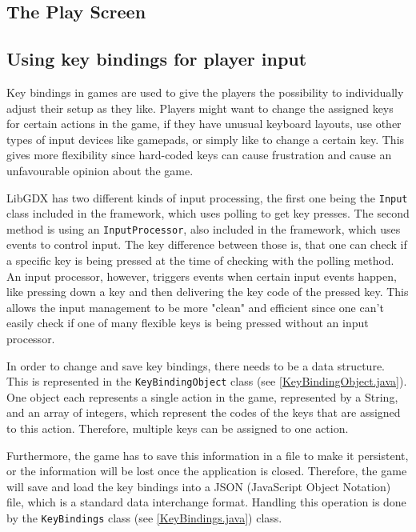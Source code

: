 \documentclass[12p]{article}
\begin{document}
 
 \subsection{The Play Screen}
 

\subsection{Using key bindings for player input}

Key bindings in games are used to give the players the possibility to individually adjust their setup as they like. Players might want to change the assigned keys for certain actions in the game, if they have unusual keyboard layouts, use other types of input devices like gamepads, or simply like to change a certain key. This gives more flexibility since hard-coded keys can cause frustration and cause an unfavourable opinion about the game.

LibGDX has two different kinds of input processing, the first one being the \texttt{Input} class included in the framework, which uses polling to get key presses. The second method is using an \texttt{InputProcessor}, also included in the framework, which uses events to control input. The key difference between those is, that one can check if a specific key is being pressed at the time of checking with the polling method. An input processor, however, triggers events when certain input events happen, like pressing down a key and then delivering the key code of the pressed key. This allows the input management to be more "clean" and efficient since one can't easily check if one of many flexible keys is being pressed without an input processor.

In order to change and save key bindings, there needs to be a data structure. This is represented in the \texttt{KeyBindingObject} class (see \ref{KeyBindingObject.java}). One object each represents a single action in the game, represented by a String, and an array of integers, which represent the codes of the keys that are assigned to this action. Therefore, multiple keys can be assigned to one action.

Furthermore, the game has to save this information in a file to make it persistent, or the information will be lost once the application is closed. Therefore, the game will save and load the key bindings into a JSON (JavaScript Object Notation) file, which is a standard data interchange format. Handling this operation is done by the \texttt{KeyBindings} class (see \ref{KeyBindings.java}) class. 
\end{document}

